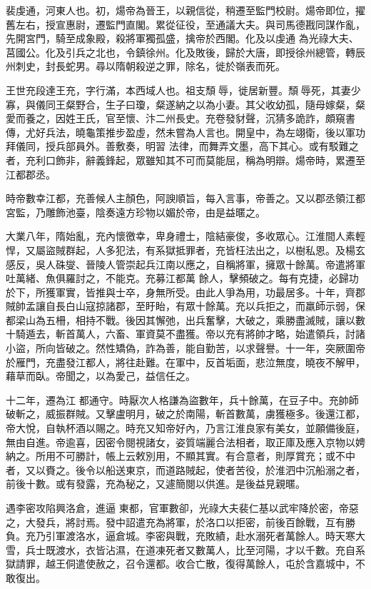 \begin{pinyinscope}
 裴虔通，河東人也。初，煬帝為晉王，以親信從，稍遷至監門校尉。煬帝即位，擢舊左右，授宣惠尉，遷監門直閣。累從征役，至通議大夫。與司馬德戡同謀作亂，先開宮門，騎至成象殿，殺將軍獨孤盛，擒帝於西閣。化及以虔通
 為光祿大夫、莒國公。化及引兵之北也，令鎮徐州。化及敗後，歸於大唐，即授徐州總管，轉辰州刺史，封長蛇男。尋以隋朝殺逆之罪，除名，徙於嶺表而死。



 王世充段達王充，字行滿，本西域人也。祖支頹辱，徙居新豐。頹辱死，其妻少寡，與儀同王粲野合，生子曰瓊，粲遂納之以為小妻。其父收幼孤，隨母嫁粲，粲愛而養之，因姓王氏，官至懷、汴二州長史。充卷發豺聲，沉猜多詭詐，頗窺書傳，尤好兵法，曉龜策推步盈虛，然未嘗為人言也。開皇中，為左翊衛，後以軍功拜儀同，授兵部員外。善敷奏，明習
 法律，而舞弄文墨，高下其心。或有駁難之者，充利口飾非，辭義鋒起，眾雖知其不可而莫能屈，稱為明辯。煬帝時，累遷至江都郡丞。



 時帝數幸江都，充善候人主顏色，阿諛順旨，每入言事，帝善之。又以郡丞領江都宮監，乃雕飾池臺，陰奏遠方珍物以媚於帝，由是益暱之。



 大業八年，隋始亂，充內懷徼幸，卑身禮士，陰結豪俊，多收眾心。江淮間人素輕悍，又屬盜賊群起，人多犯法，有系獄抵罪者，充皆枉法出之，以樹私恩。及楊玄感反，吳人硃燮、晉陵人管崇起兵江南以應之，自稱將軍，擁眾十餘萬。帝遣將軍吐萬緒、魚俱羅討之，不能克。充募江都萬
 餘人，擊頻破之。每有克捷，必歸功於下，所獲軍實，皆推與士卒，身無所受。由此人爭為用，功最居多。十年，齊郡賊帥孟讓自長白山寇掠諸郡，至盱眙，有眾十餘萬。充以兵拒之，而羸師示弱，保都梁山為五柵，相持不戰。後因其懈弛，出兵奮擊，大破之，乘勝盡滅賊，讓以數十騎遁去，斬首萬人，六畜、軍資莫不盡獲。帝以充有將帥才略，始遣領兵，討諸小盜，所向皆破之。然性矯偽，詐為善，能自勤苦，以求聲譽。十一年，突厥圍帝於雁門，充盡發江都人，將往赴難。在軍中，反首垢面，悲泣無度，曉夜不解甲，藉草而臥。帝聞之，以為愛己，益信任之。



 十二年，遷為江
 都通守。時厭次人格謙為盜數年，兵十餘萬，在豆子中。充帥師破斬之，威振群賊。又擊盧明月，破之於南陽，斬首數萬，虜獲極多。後還江都，帝大悅，自執杯酒以賜之。時充又知帝好內，乃言江淮良家有美女，並願備後庭，無由自進。帝逾喜，因密令閱視諸女，姿質端麗合法相者，取正庫及應入京物以娉納之。所用不可勝計，帳上云敕別用，不顯其實。有合意者，則厚賞充；或不中者，又以賚之。後令以船送東京，而道路賊起，使者苦役，於淮泗中沉船溺之者，前後十數。或有發露，充為秘之，又遽簡閱以供進。是後益見親暱。



 遇李密攻陷興洛倉，進逼
 東都，官軍數卻，光祿大夫裴仁基以武牢降於密，帝惡之，大發兵，將討焉。發中詔遣充為將軍，於洛口以拒密，前後百餘戰，互有勝負。充乃引軍渡洛水，逼倉城。李密與戰，充敗績，赴水溺死者萬餘人。時天寒大雪，兵士既渡水，衣皆沾濕，在道凍死者又數萬人，比至河陽，才以千數。充自系獄請罪，越王侗遣使赦之，召令還都。收合亡散，復得萬餘人，屯於含嘉城中，不敢復出。




\end{pinyinscope}
